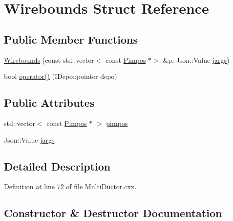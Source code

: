 \hypertarget{struct_wirebounds}{}\section{Wirebounds Struct Reference}
\label{struct_wirebounds}
\subsection*{Public Member Functions}
\begin{DoxyCompactItemize}
\item 
\hyperlink{struct_wirebounds_a1af37cf10ec6c95e34bc70f2f8c10aa1}{Wirebounds} (const std\+::vector$<$ const \hyperlink{class_wire_cell_1_1_pimpos}{Pimpos} $\ast$$>$ \&p, Json\+::\+Value \hyperlink{struct_wirebounds_acef75c3717cc50da1d04467ca5b2b576}{jargs})
\item 
bool \hyperlink{struct_wirebounds_ae82b5974ab795b29315f4926957cd13f}{operator()} (I\+Depo\+::pointer depo)
\end{DoxyCompactItemize}
\subsection*{Public Attributes}
\begin{DoxyCompactItemize}
\item 
std\+::vector$<$ const \hyperlink{class_wire_cell_1_1_pimpos}{Pimpos} $\ast$ $>$ \hyperlink{struct_wirebounds_a0088eec86ae6cddaba6e8b0176c161f5}{pimpos}
\item 
Json\+::\+Value \hyperlink{struct_wirebounds_acef75c3717cc50da1d04467ca5b2b576}{jargs}
\end{DoxyCompactItemize}


\subsection{Detailed Description}


Definition at line 72 of file Multi\+Ductor.\+cxx.



\subsection{Constructor \& Destructor Documentation}
\mbox{\label{struct_wirebounds_a1af37cf10ec6c95e34bc70f2f8c10aa1}} 
